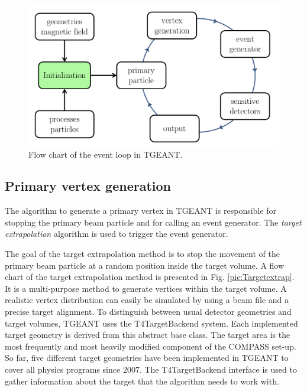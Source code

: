\begin{figure}[!h]
  \centering
	\includegraphics[scale=0.5]{./gfx/EventLoop.png}
	\caption{Flow chart of the event loop in TGEANT.}
	\label{pic:EventLoop}
\end{figure}

\subsection{Primary vertex generation}

The algorithm to generate a primary vertex in TGEANT is responsible for stopping the primary beam particle and for calling an event generator. The \textit{target extrapolation} algorithm is used to trigger the event generator.

The goal of the target extrapolation method is to stop the movement of the primary beam particle at a random position inside the target volume. A flow chart of the target extrapolation method is presented in Fig. \ref{pic:Targetextrap}. It is a multi-purpose method to generate vertices within the target volume. A realistic vertex distribution can easily be simulated by using a beam file and a precise target alignment.
To distinguish between usual detector geometries and target volumes, TGEANT uses the T4TargetBackend system. Each implemented target geometry is derived from this abstract base class. The target area is the most frequently and most heavily modified component of the COMPASS set-up. So far, five different target geometries have been implemented in TGEANT to cover all physics programs since 2007. The T4TargetBackend interface is used to gather information about the target that the algorithm needs to work with.

